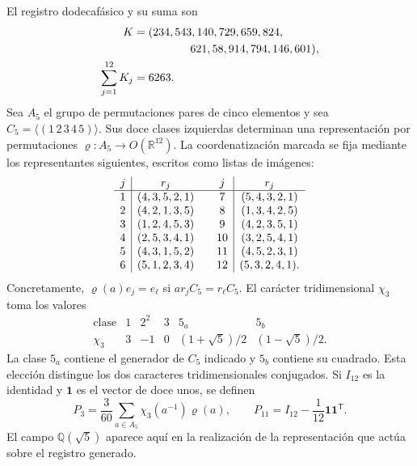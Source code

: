 El registro dodecafásico y su suma son
\begin{equation}
 \begin{split}
 K={}&(234,543,140,729,659,824,\\
     &\hspace{13mm}621,58,914,794,146,601),\\
 \sum_{j=1}^{12}K_j={}&6263.
 \end{split}
 \label{eq:leech-K}
\end{equation}
Sea \(A_5\) el grupo de permutaciones pares de cinco elementos y sea
\(C_5=\langle(1\,2\,3\,4\,5)\rangle\). Sus doce clases izquierdas
determinan una representación por permutaciones
\(\varrho:A_5\to O(\mathbb R^{12})\). La coordenatización marcada se fija mediante
los representantes siguientes, escritos como listas de imágenes:
\[
\begin{array}{c|c@{\qquad}c|c}
j&r_j&j&r_j\\ \hline
1&(4,3,5,2,1)&7&(5,4,3,2,1)\\
2&(4,2,1,3,5)&8&(1,3,4,2,5)\\
3&(1,2,4,5,3)&9&(4,2,3,5,1)\\
4&(2,5,3,4,1)&10&(3,2,5,4,1)\\
5&(4,3,1,5,2)&11&(4,5,2,3,1)\\
6&(5,1,2,3,4)&12&(5,3,2,4,1).
\end{array}
\]
Concretamente, \(\varrho(a)e_j=e_\ell\) si
\(ar_jC_5=r_\ell C_5\). El carácter tridimensional \(\chi_3\) toma
los valores
\[
\begin{array}{c|ccccc}
\text{clase}&1&2^2&3&5_a&5_b\\ \hline
\chi_3&3&-1&0&(1+\sqrt5)/2&(1-\sqrt5)/2.
\end{array}
\]
La clase \(5_a\) contiene el generador de \(C_5\) indicado y \(5_b\)
contiene su cuadrado. Esta elección distingue los dos caracteres
tridimensionales conjugados. Si \(I_{12}\) es la identidad y
\(\mathbf1\) es el vector de doce unos, se definen
\begin{equation}
 P_3=\frac3{60}\sum_{a\in A_5}\chi_3(a^{-1})\varrho(a),
 \qquad
 P_{11}=I_{12}-\frac1{12}\mathbf1\mathbf1^{\mathsf T}.
 \label{eq:leech-projectors}
\end{equation}
El campo \(\mathbb Q(\sqrt5)\) aparece aquí en la realización de la
representación que actúa sobre el registro generado.

